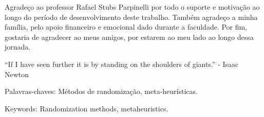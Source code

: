 \documentclass[a4paper,12pt]{monografia}
\begin{document}

\bacharelado {}  
\data{\today}

 



\maketitle

  Agradeço ao professor Rafael Stubs Parpinelli por todo o suporte e motivação ao longo do período de desenvolvimento deste trabalho. Também agradeço a minha família, pelo apoio financeiro e emocional dado durante a faculdade. Por fim, gostaria de agradecer ao meus amigos, por estarem ao meu lado ao longo dessa jornada. 

\newpage

\begin{epigrafe}

  ``If I have seen further it is by standing on the shoulders of giants.'' - Isaac Newton

\end{epigrafe}




\noindent Palavras-chaves: Métodos de randomização, meta-heurísticas.




\noindent Keywords: Randomization methods, metaheuristics.

\listoffigures

\listoftables



\tableofcontents

\pagestyle{ruledheader}










\end{document}
